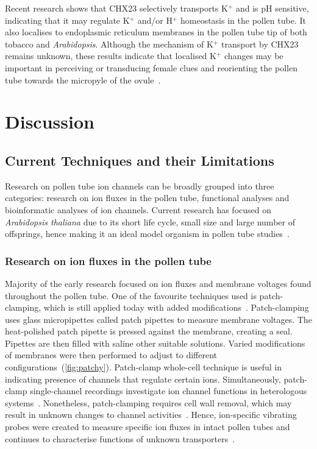 \documentclass[11pt]{article}
\begin{document}
\begin{multicols*}{2}
Recent research shows that CHX23 selectively transports K$^{+}$ and is pH sensitive, indicating that it may regulate K$^{+}$ and/or H$^{+}$ homeostasis in the pollen tube. It also localises to endoplasmic reticulum  membranes in the pollen tube tip of both tobacco and \textit{Arabidopsis}. Although the mechanism of K$^{+}$ transport by CHX23 remains unknown, these results indicate that localised K$^{+}$ changes may be important in perceiving or transducing female clues and reorienting the pollen tube towards the micropyle of the ovule~\citep{Lu2011}. 

\section{Discussion}
\subsection{Current Techniques and their Limitations}
Research on pollen tube ion channels can be broadly grouped into three categories: research on ion fluxes in the pollen tube, functional analyses and bioinformatic analyses of ion channels. Current research has focused on \textit{Arabidopsis thaliana} due to its short life cycle, small size and large number of offsprings, hence making it an ideal model organism in pollen tube studies~\citep{Arabidopsis2000}. 

\subsubsection{Research on ion fluxes in the pollen tube}
Majority of the early research focused on ion fluxes and membrane voltages found throughout the pollen tube. One of the favourite techniques used is patch-clamping, which is still applied today with added modifications~\citep{Chen2009}. Patch-clamping uses glass micropipettes called patch pipettes to measure membrane voltages. The heat-polished patch pipette is pressed against the membrane, creating a seal. Pipettes are then filled with saline other suitable solutions. Varied modifications of membranes were then performed to adjust to different configurations~(\autoref{fig:patchy})\citep{Sakmann1984}. 
\newline\newline
Patch-clamp whole-cell technique is useful in indicating presence of channels that regulate certain ions. Simultaneously, patch-clamp single-channel recordings investigate ion channel functions in heterologous systems~\citep{Hedrich2012}. Nonetheless, patch-clamping requires cell wall removal, which may result in unknown changes to channel activities~\citep{Dutta2004}. Hence, ion-specific vibrating probes were created to measure specific ion fluxes in intact pollen tubes and continues to characterise functions of unknown transporters~\citep{Kunkel2006}.


\end{multicols*}
\end{document}
